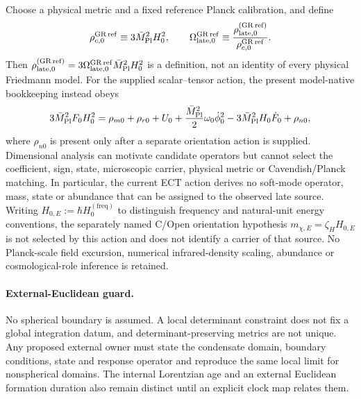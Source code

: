 Choose a physical metric and a fixed reference Planck calibration,
and define
\begin{equation}
 \rho_{c,0}^{\rm GR\,ref}\equiv3\bar M_{\rm Pl}^2H_0^2,\qquad
 \Omega_{\rm late,0}^{\rm GR\,ref}
 \equiv\frac{\rho_{\rm late,0}^{(\rm GR\,ref)}}
 {\rho_{c,0}^{\rm GR\,ref}} .
 \label{eq:late_source_identity_app}
\end{equation}
Then
$\rho_{\rm late,0}^{(\rm GR\,ref)}
=3\Omega_{\rm late,0}^{\rm GR\,ref}\bar M_{\rm Pl}^2H_0^2$ is a
definition, not an identity of every physical Friedmann model.  For the
supplied scalar--tensor action, the present model-native bookkeeping instead
obeys
\begin{equation}
 3\bar M_{\rm Pl}^2F_0H_0^2
 =\rho_{m0}+\rho_{r0}+U_0
 +\frac{\bar M_{\rm Pl}^2}{2}\omega_0\dot\phi_0^2
 -3\bar M_{\rm Pl}^2H_0\dot F_0
 +\rho_{n0},
 \label{eq:late_source_scalar_tensor_app}
\end{equation}
where $\rho_{n0}$ is present only after a separate orientation action is
supplied.  Dimensional analysis can motivate candidate operators but cannot
select the coefficient, sign, state, microscopic carrier, physical metric or
Cavendish/Planck matching.  In particular, the current ECT action derives no
soft-mode operator, mass, state or abundance that can be assigned to the
observed late source.  Writing
$H_{0,E}:=\hbar H_0^{(\mathrm{freq})}$ to distinguish frequency and
natural-unit energy conventions, the separately named C/Open orientation
hypothesis $m_{\chi,E}=\zeta_HH_{0,E}$ is not selected by this action and
does not identify a carrier of that source.  No Planck-scale field excursion,
numerical infrared-density scaling, abundance or cosmological-role inference
is retained.

\paragraph{External-Euclidean guard.}
No spherical boundary is assumed.  A local determinant constraint does not
fix a global integration datum, and determinant-preserving metrics are not
unique.  Any proposed external owner must state the condensate domain,
boundary conditions, state and response operator and reproduce the same
local limit for nonspherical domains.  The internal Lorentzian age and an
external Euclidean formation duration also remain distinct until an explicit
clock map relates them.


